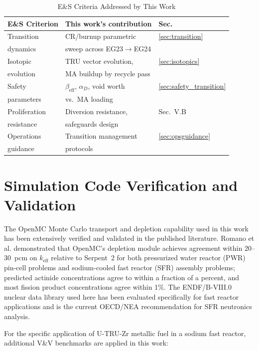 \documentclass[10pt,twoside]{article}
\begin{document}
\begin{table}[ht]
\caption{E\&S Criteria Addressed by This Work}
\label{tab:mapping}
\footnotesize
\setlength{\tabcolsep}{2pt}
\begin{tabular}{p{2.5cm}p{2.5cm}p{1.4cm}}
\toprule
E\&S Criterion & This work's contribution & Sec. \\
\midrule
Transition & CR/burnup parametric & \ref{sec:transition} \\
dynamics   & sweep across EG23$\rightarrow$EG24 & \\
Isotopic   & TRU vector evolution, & \ref{sec:isotopics} \\
evolution  & MA buildup by recycle pass & \\
Safety     & $\beta_\text{eff}$, $\alpha_D$, void worth & \ref{sec:safety_transition} \\
parameters & vs.\ MA loading & \\
Proliferation & Diversion resistance, & Sec.~V.B \\
resistance & safeguards design & \\
Operations & Transition management & \ref{sec:opsguidance} \\
guidance   & protocols & \\
\bottomrule
\end{tabular}
\end{table}

\section{Simulation Code Verification and Validation}

The OpenMC Monte Carlo transport and depletion capability used in this work
has been extensively verified and validated in the published literature.
Romano et al.\cite{Romano2021} demonstrated that OpenMC's depletion
module achieves agreement within 20--30~pcm on $k_\text{eff}$ relative to
Serpent~2 for both pressurized water reactor (PWR) pin-cell problems and
sodium-cooled fast reactor (SFR) assembly problems; predicted actinide
concentrations agree to within a fraction of a percent, and most fission
product concentrations agree within 1\%.  The ENDF/B-VIII.0 nuclear data
library used here has been evaluated specifically for fast reactor
applications and is the current OECD/NEA recommendation for SFR
neutronics analysis.\cite{Brown2018}

For the specific application of U-TRU-Zr metallic fuel in a sodium fast
reactor, additional V\&V benchmarks are applied in this work:
\end{document}
